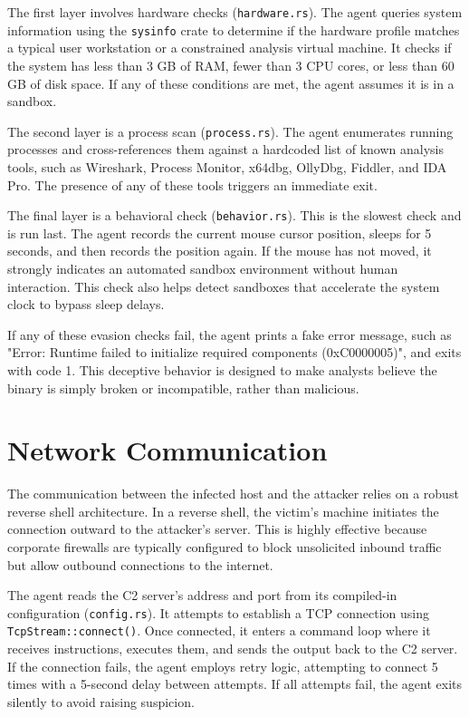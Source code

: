\documentclass[12pt,a4paper]{article}
\newcommand{\code}[1]{\texttt{\textcolor{primaryblue}{#1}}}
\begin{document}
The first layer involves hardware checks (\code{hardware.rs}). The agent queries system information using the \code{sysinfo} crate to determine if the hardware profile matches a typical user workstation or a constrained analysis virtual machine. It checks if the system has less than 3 GB of RAM, fewer than 3 CPU cores, or less than 60 GB of disk space. If any of these conditions are met, the agent assumes it is in a sandbox.

The second layer is a process scan (\code{process.rs}). The agent enumerates running processes and cross-references them against a hardcoded list of known analysis tools, such as Wireshark, Process Monitor, x64dbg, OllyDbg, Fiddler, and IDA Pro. The presence of any of these tools triggers an immediate exit.

The final layer is a behavioral check (\code{behavior.rs}). This is the slowest check and is run last. The agent records the current mouse cursor position, sleeps for 5 seconds, and then records the position again. If the mouse has not moved, it strongly indicates an automated sandbox environment without human interaction. This check also helps detect sandboxes that accelerate the system clock to bypass sleep delays.

If any of these evasion checks fail, the agent prints a fake error message, such as "Error: Runtime failed to initialize required components (0xC0000005)", and exits with code 1. This deceptive behavior is designed to make analysts believe the binary is simply broken or incompatible, rather than malicious.

\section{Network Communication}

The communication between the infected host and the attacker relies on a robust reverse shell architecture. In a reverse shell, the victim's machine initiates the connection outward to the attacker's server. This is highly effective because corporate firewalls are typically configured to block unsolicited inbound traffic but allow outbound connections to the internet. 

The agent reads the C2 server's address and port from its compiled-in configuration (\code{config.rs}). It attempts to establish a TCP connection using \code{TcpStream::connect()}. Once connected, it enters a command loop where it receives instructions, executes them, and sends the output back to the C2 server. If the connection fails, the agent employs retry logic, attempting to connect 5 times with a 5-second delay between attempts. If all attempts fail, the agent exits silently to avoid raising suspicion.
\end{document}
